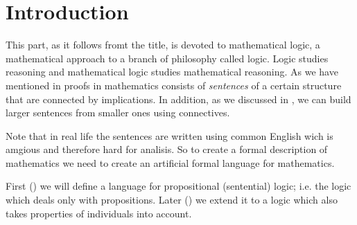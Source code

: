 \chapter*{Introduction}
This part, as it follows fromt the title, is devoted to mathematical logic,
a mathematical approach to a branch of philosophy called logic. Logic studies
reasoning and mathematical logic studies mathematical reasoning. As we have
mentioned in  proofs in mathematics consists of
\emph{sentences} of a certain structure that are connected by implications.
In addition,  as we discussed in , we can build larger
sentences from smaller ones using connectives.

Note that in real life the sentences are written using common English wich is
amgious and therefore hard for analisis.
So to create a formal description of mathematics we need to create an
artificial formal language for mathematics.

First () we will define a language for
propositional (sentential) logic; i.e. the logic which deals only with
propositions. Later () we extend it to a logic
which also takes properties of individuals into account.
